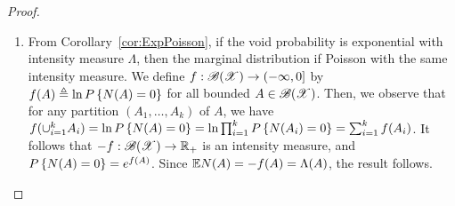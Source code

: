 \documentclass[letterpaper,10pt,english]{article}
\begin{document}
\begin{proof}
\begin{enumerate}
\begin{itemize}
Since the expansion of $(a_1 + \dots + a_k)^m = \sum_{n_1 + \dots+n_k = m}\binom{m}{n_1, \dots, n_k}\prod_{i=1}^ka_i^{n_i}$, 
we get 
Equating each term in the summation, we get $P\set{N(A_1) = n_1, \dots, N(A_k) = n_k} = \prod_{i=1}^kP\set{N(A_i) = n_i}$. 
\end{itemize}

\item[$iv \implies i\_$] 
From Corollary~\ref{cor:ExpPoisson}, if the void probability is exponential with intensity measure $\Lambda$, then the marginal distribution if Poisson with the same intensity measure. 
We define $f:\mathscr{B}(\mathscr{X})\to(-\infty, 0]$ by $f(A) \triangleq \ln P\left\{N(A) = 0\right\}$ for all bounded $A \in \mathscr{B}(\mathscr{X})$. 
Then, we observe that for any partition $(A_1,\dots, A_k)$ of $A$, we have $f(\cup_{i=1}^kA_i) = \ln P\left\{N(A)= 0\right\} = \ln\prod_{i=1}^kP\left\{N(A_i) = 0\right\} = \sum_{i=1}^kf(A_i)$.
It follows that $-f:\mathscr{B}(\mathscr{X})\to\mathbb{R}_+$ is an intensity measure, and $P\left\{N(A)=0\right\} = e^{f(A)}$. 
Since $\mathbb{E} N(A) = -f(A) = \Lambda(A)$, the result follows. 
\end{enumerate}
\end{proof}
\end{document}
